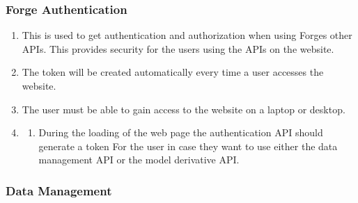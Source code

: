 \documentclass[letterpaper, 10pt, draftclsnofoot, compsoc, onecolumn]{IEEEtran}
\begin{document}
\subsubsection{Forge Authentication}
\begin{enumerate}
	\item This is used to get authentication and authorization when using Forges other APIs. This provides security for the users using 
	the APIs on the website. 

	\item The token will be created automatically every time a user accesses the website.

	\item The user must be able to gain access to the website on a laptop or desktop.

	\item 
	\begin{enumerate}
		\item During the loading of the web page the authentication API should generate a token For the user in case they want to use 
		either the data management API or the model derivative API. 
	\end{enumerate}
\end{enumerate}

\subsubsection{Data Management}
\end{document}
